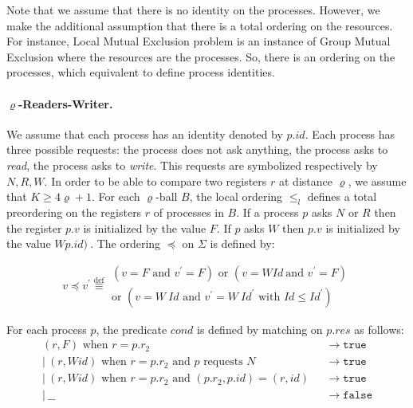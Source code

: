 \documentclass[11pt]{article}
\newcommand{\TRUE}{\mathtt{true}}
\newcommand{\FALSE}{\mathtt{false}}
\newcommand{\text}[1]{\mbox{#1}}
\begin{document}
Note that we assume that there is no identity on the processes.  However, we make the additional assumption 
that there is a total ordering on the resources. For instance, Local Mutual Exclusion problem is an instance of 
Group Mutual Exclusion where the resources are the processes.  So, there is an ordering on the processes, which equivalent 
to define process identities.



\paragraph{$\varrho$-Readers-Writer.}

We assume that each process has an identity denoted by $p.id$. Each process has three possible requests: the process does not ask
anything, the process asks to \emph{read}, the
process asks to \emph{write}. This requests are
symbolized respectively by $N,R,W$. In order to be able
to compare two registers $r$ at distance $\varrho $, we assume that $K\geq
4\varrho +1$. For each $\varrho $-ball $B$, the local ordering $\leq _{l}$
defines a total preordering on the registers $r$ of processes in $B$. 
If a process $p$ asks $N$ or $R$ then the register $p.v$ is initialized by
the value $F$. If $p$ asks  $W$ then $p.v$ is initialized
by the value $W p.id) \ $.  
The ordering $\preceq $ on $\Sigma $ is defined by:


\[
v\preceq v^{\prime } \stackrel{\mathrm{def}}{\equiv} 
\begin{array}{l}
(v=F\text{ and }v^{\prime }=F)\text{ or }\left( v=WId\ \text{and }v^{\prime
}=F\right)  \\ 
\text{or }\left( v=W\ Id\text{ and }v^{\prime }=W\ Id^{\prime }\text{ with }Id\leq Id^{\prime }\right) 
\end{array}
\]

For each process $p$, the predicate $cond$ is defined by matching on $p.res$ as follows: 
\[
\begin{array}{ll}
\left( r,F\right) \text{ when } r =p.r_{2}\text{ } & \rightarrow \TRUE \\
|\ \left( r, W id\right) \text{ when } r =p.r_2\text{ and } p\text{ requests } N & \rightarrow \TRUE \\
|\ \left( r, W id\right) \text{ when }r =p.r_2\text{ and }\left(p.r_{2},p.id\right) =\left( r,id\right) \text{ } &\rightarrow \TRUE \\
|\ \_ \_ & \rightarrow  \FALSE
\end{array}
\]
\end{document}
